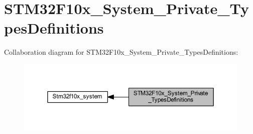 \hypertarget{group___s_t_m32_f10x___system___private___types_definitions}{}\section{S\+T\+M32\+F10x\+\_\+\+System\+\_\+\+Private\+\_\+\+Types\+Definitions}
\label{group___s_t_m32_f10x___system___private___types_definitions}
Collaboration diagram for S\+T\+M32\+F10x\+\_\+\+System\+\_\+\+Private\+\_\+\+Types\+Definitions\+:
\nopagebreak
\begin{figure}[H]
\begin{center}
\leavevmode
\includegraphics[width=350pt]{group___s_t_m32_f10x___system___private___types_definitions}
\end{center}
\end{figure}
